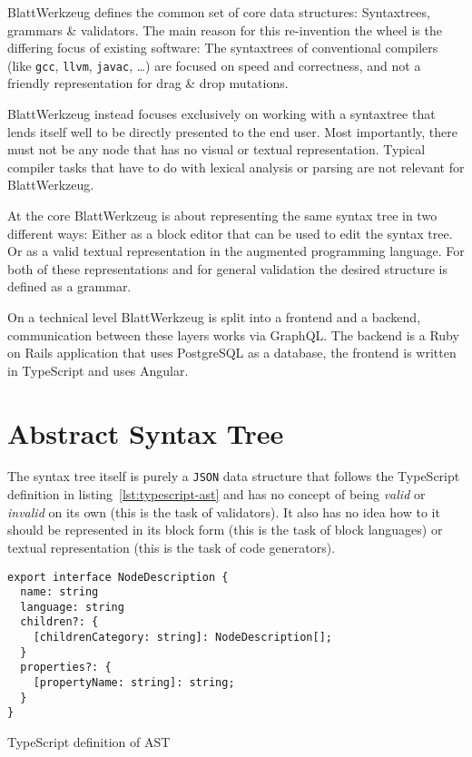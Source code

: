 \documentclass[sigconf,review=true]{acmart}
\begin{document}
Blatt\-Werkzeug defines the common set of core data structures: Syntax\-trees, grammars \& validators. The main reason for this re-invention the wheel is the differing focus of existing software: The syntaxtrees of conventional compilers (like \texttt{gcc}, \texttt{llvm}, \texttt{javac}, …) are focused on speed and correctness, and not a friendly representation for drag \& drop mutations.

BlattWerkzeug instead focuses exclusively on working with a syntaxtree that lends itself well to be directly presented to the end user. Most importantly, there must not be any node that has no visual or textual representation. Typical compiler tasks that have to do with lexical analysis or parsing are not relevant for Blatt\-Werkzeug.

At the core Blatt\-Werkzeug is about representing the same syntax tree in two different ways: Either as a block editor that can be used to edit the syntax tree. Or as a valid textual representation in the augmented programming language. For both of these representations and for general validation the desired structure is defined as a grammar.

On a technical level Blatt\-Werkzeug is split into a frontend and a backend, communication between these layers works via GraphQL. The backend is a Ruby on Rails application that uses PostgreSQL as a database, the frontend is written in TypeScript and uses Angular.

\section{Abstract Syntax Tree}

The syntax tree itself is purely a \texttt{JSON} data structure that follows the TypeScript definition in listing~\ref{lst:typescript-ast} and has no concept of being \textit{valid} or \textit{invalid} on its own (this is the task of validators). It also has no idea how to it should be represented in its block form (this is the task of block languages) or textual representation (this is the task of code generators).

\begin{listing}[H]
\begin{verbatim}
export interface NodeDescription {
  name: string
  language: string
  children?: {
    [childrenCategory: string]: NodeDescription[];
  }
  properties?: {
    [propertyName: string]: string;
  }
}
\end{verbatim}
\caption{TypeScript definition of AST}
\label{lst:typescript-ast}
\end{listing}
\end{document}
